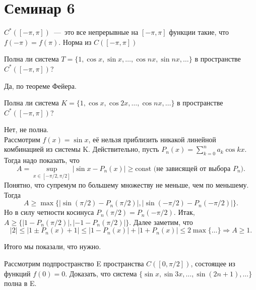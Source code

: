 \section{Семинар 6}

\begin{reminder}
    $C^*([-\pi, \pi])$~---~это все непрерывные на $[-\pi, \pi]$ функции такие, что $f(-\pi) = f(\pi)$. Норма из $C([-\pi, \pi])$
\end{reminder}

\begin{problem}
    Полна ли система $T = \{1, \cos{x}, \sin{x}, \ldots, \cos{nx}, \sin{nx}, \ldots\}$ в пространстве $C^*([-\pi, \pi])$?
\end{problem}

\begin{solution}
    Да, по теореме Фейера.
\end{solution}

\begin{problem}
    Полна ли система $K = \{1, \cos{x}, \cos{2x}, \ldots, \cos{nx}, \ldots\}$ в пространстве $C^*([-\pi, \pi])$?
\end{problem}

\begin{solution}
    Нет, не полна.\\
    Рассмотрим $f(x) = \sin{x}$, её нельзя приблизить никакой линейной комбинацией из системы K. Действительно, пусть $P_n (x) = \sum_{k = 0}^n a_k \cos{kx}$. Тогда надо показать, что
    $$A = \sup_{x \in [-\pi / 2, \pi / 2]}|\sin{x} - P_n(x)| \geq \text{const (не зависящей от выбора } P_n).$$
    Понятно, что супремум по большему множеству не меньше, чем по меньшему. Тогда $$A \geq \max\{|\sin{(\pi / 2)} - P_n(\pi / 2)|, |\sin{(-\pi / 2)} - P_n(-\pi / 2)|\}.$$
    Но в силу четности косинуса $P_n(\pi / 2) = P_n(-\pi / 2).$ Итак, $A \geq \{ |1 - P_n(\pi / 2)|, |-1 - P_n(\pi / 2)| \}$.
    Далее заметим, что
    $$|2| \leq |1 \pm P_n (x) + 1| \leq |1 - P_n (x)| + |1 + P_n (x)| \leq 2 \max\{\ldots\} \Longrightarrow A \geq 1.$$

    Итого мы показали, что нужно.
\end{solution}

\begin{problem}
    Рассмотрим подпространство E пространства $C([0, \pi / 2])$, состоящее из функций $f(0) = 0$. Доказать, что система $\{ \sin{x}, \sin{3x}, \ldots, \sin{(2n + 1), \ldots\}}$ полна в E.
\end{problem}

